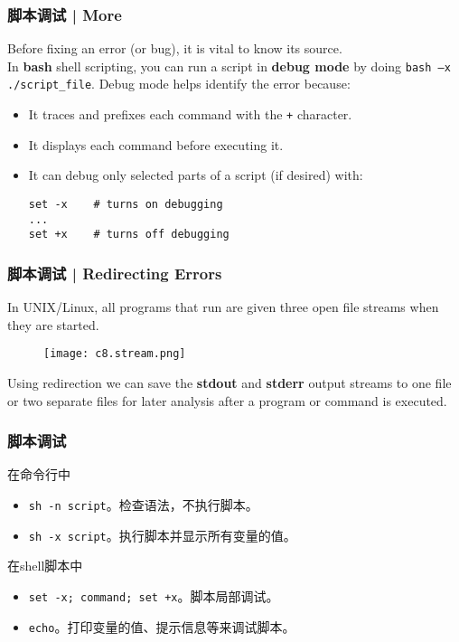 \begin{frame}[fragile]
  \frametitle{脚本调试 | More}
  Before fixing an error (or bug), it is vital to know its source.\\
  \vspace{0.3cm}
  In \textbf{bash} shell scripting, you can run a script in \textbf{debug mode} by doing \verb|bash –x ./script_file|. Debug mode helps identify the error because:
  \begin{itemize}
    \item It traces and prefixes each command with the \verb|+| character.
    \item It displays each command before executing it.
    \item It can debug only selected parts of a script (if desired) with:\\
\begin{lstlisting}
set -x    # turns on debugging
...
set +x    # turns off debugging
\end{lstlisting}
  \end{itemize}
\end{frame}

\begin{frame}
  \frametitle{脚本调试 | Redirecting Errors}
  In UNIX/Linux, all programs that run are given three open file streams when they are started.
  \vspace{-0.3cm}
  \begin{figure}
    \centering
    \texttt{[image: c8.stream.png]}
  \end{figure}
  \vspace{-0.3cm}
  Using redirection we can save the \textbf{stdout} and \textbf{stderr} output streams to one file or two separate files for later analysis after a program or command is executed.
\end{frame}


\begin{frame}[fragile]
  \frametitle{\alert{脚本调试}}
  \begin{block}{在命令行中}
  \begin{itemize}
    \item \verb|sh -n script|。检查语法，不执行脚本。
    \item \verb|sh -x script|。执行脚本并显示所有变量的值。
  \end{itemize}
\end{block}
\pause
  \begin{block}{在shell脚本中}
  \begin{itemize}
    \item \verb|set -x; command; set +x|。脚本局部调试。
    \item \verb|echo|。打印变量的值、提示信息等来调试脚本。
  \end{itemize}
\end{block}
\end{frame}


